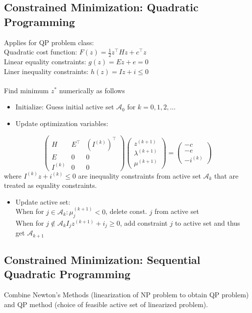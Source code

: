 \documentclass[english]{latex4ei/latex4ei_sheet}
\begin{document}
\begin{sectionbox}
\subsection{Constrained Minimization: Quadratic Programming}
Applies for QP problem class:\\
Quadratic cost function: $F(z)=\frac{1}{2}z^{\top}Hz+c^{\top}z$\\
Linear equality constraints: $g(z)=Ez+e=0$\\
Liner inequality constraints: $h(z)=Iz+i\leq 0$\\
\\
Find minimum $z^{*}$ numerically as follows
\begin{itemize}
    \item Initialize: Guess initial active set $\mathcal{A}_0$ for $k=0,1,2,\ldots$
    \item Update optimization variables:
\end{itemize}
$$\left(\begin{array}{ccc}{H} & {E^{\top}} & {\left(I^{(k)}\right)^{\top}} \\ {E} & {0} & {0} \\ {I^{(k)}} & {0} & {0}\end{array}\right)\left(\begin{array}{l}{z^{(k+1)}} \\ {\lambda^{(k+1)}} \\ {\mu^{(k+1)}}\end{array}\right)=\left(\begin{array}{c}{-c} \\ {-e} \\ {-i^{(k)}}\end{array}\right)$$
where $I^{(k)}z+i^{(k)}\leq 0$ are inequality constraints from active set $\mathcal{A}_k$ that are treated as equality constraints.
\begin{itemize}
    \item Update active set:\\
    When for $j \in \mathcal{A}_{k}: \mu_{j}^{(k+1)}<0$, delete const. $j$ from active set\\
    When for $j \notin \mathcal{A}_{k} I_{j} z^{(k+1)}+i_{j} \geq 0$, add constraint $j$ to active set and thus get $\mathcal{A}_{k+1}$
\end{itemize}\vspace{0.2cm}

\subsection{Constrained Minimization: Sequential Quadratic Programming}
Combine Newton's Methods (linearization of NP problem to obtain QP problem) and QP method (choice of feasible active set of linearized problem).


\end{sectionbox}
\end{document}
